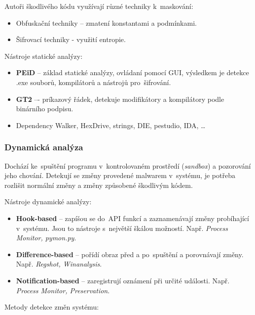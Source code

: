 Autoři škodlivého kódu využívají různé techniky k~maskování:

\begin{itemize}
    \item Obfuskační techniky -- zmatení konstantami a podmínkami.
    \item Šifrovací techniky - využití entropie.
\end{itemize}

Nástroje statické analýzy:

\begin{itemize}
    \item \textbf{PEiD} -- základ statické analýzy, ovládaní pomocí GUI, výsledkem je detekce .exe souborů, kompilátorů a nástrojů pro~šifrování.
    \item \textbf{GT2} –- príkazový řádek, detekuje modifikátory a kompilátory podle binárního podpisu.
    \item Dependency Walker, HexDrive, strings, DIE, pestudio, IDA, \dots
\end{itemize}


\subsubsection{Dynamická analýza}

Dochází ke~spuštění programu v~kontrolovaném prostředí (\emph{sandbox}) a pozorování jeho chování.
Detekují se změny provedené malwarem v~systému, je potřeba rozlišit normální změny a změny způsobené škodlivým kódem.


Nástroje dynamické analýzy:

\begin{itemize}
    \item \textbf{Hook-based} -- zapíšou se do~API funkcí a zaznamenávají změny probíhající v~systému. Jsou to nástroje s~největší škálou možností.
    Např. \textit{Process Monitor, pymon.py}.
    \item \textbf{Difference-based} -- pořídí obraz před a po~spuštění a porovnávají změny.
    Např. \textit{Regshot, Winanalysis}.
    \item \textbf{Notification-based} -- zaregistrují oznámení při určité události.
    Např. \textit{Process Monitor, Preservation}.
\end{itemize}

Metody detekce změn systému:

